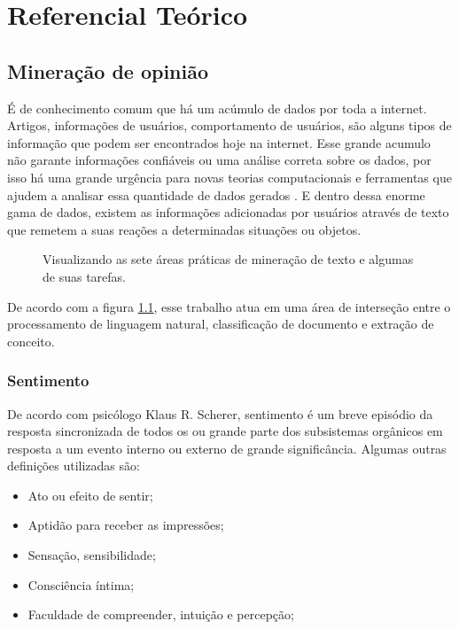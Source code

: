 \chapter{Referencial Teórico}\label{cap:referencial_teorico}

\section{Mineração de opinião}\label{sec:mineracao_dados}

É de conhecimento comum que há um acúmulo de dados por toda a internet. Artigos, informações de usuários, comportamento de usuários, são alguns tipos de informação que podem ser encontrados hoje na internet. Esse grande acumulo não garante informações confiáveis ou uma análise correta sobre os dados, por isso há uma grande urgência para novas teorias computacionais e ferramentas que ajudem a analisar essa quantidade de dados gerados \cite{fayyad1996data}. E dentro dessa enorme gama de dados, existem as informações adicionadas por usuários através de texto que remetem a suas reações a determinadas situações ou objetos.

\begin{figure}[H]
	\centering{}
	\caption{Visualizando as sete áreas práticas de mineração de texto e algumas de suas tarefas. \cite{miner2012practical} }
	\label{venn}
\end{figure}

De acordo com a figura \ref{venn}, esse trabalho atua em uma área de interseção entre o processamento de linguagem natural, classificação de documento e extração de conceito.

\subsection{Sentimento}
De acordo com psicólogo Klaus R. Scherer, sentimento é um breve episódio da resposta sincronizada de todos os ou grande parte dos subsistemas orgânicos em resposta a um evento interno ou externo de grande significância\cite{scherer2001emotional}. Algumas outras definições utilizadas são:
\begin{itemize}
	\item Ato ou efeito de sentir;
	\item Aptidão para receber as impressões;
	\item Sensação, sensibilidade;
	\item Consciência íntima;
	\item Faculdade de compreender, intuição e percepção;
\end{itemize}

